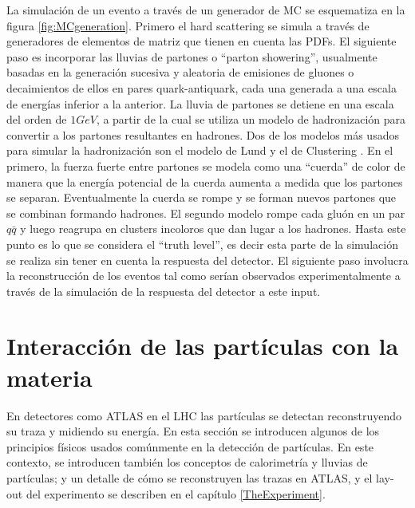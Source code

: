 La simulación de un evento a través de un generador de MC se esquematiza en la figura \ref{fig:MCgeneration}. Primero el hard scattering se simula a través de generadores de elementos de matriz que tienen en cuenta las PDFs. El siguiente paso es incorporar las lluvias de partones o ``parton showering'', usualmente basadas en la generación sucesiva y aleatoria de emisiones de gluones o decaimientos de ellos en pares quark-antiquark, cada una generada a una escala de energías inferior a la anterior. La lluvia de partones se detiene en una escala del orden de $1 GeV$, a partir de la cual se utiliza un modelo de hadronización para convertir a los partones resultantes en hadrones. Dos de los modelos más usados para simular la hadronización son el modelo de Lund \cite{Lund} y el de Clustering \cite{Cluster} . En el primero, la fuerza fuerte entre partones se modela como una ``cuerda''  de color de manera que la energía potencial de la cuerda aumenta a medida que los partones se separan. Eventualmente la cuerda se rompe y se forman nuevos partones que se combinan formando hadrones. El segundo modelo rompe cada gluón en un par $q\bar{q}$ y luego reagrupa en clusters incoloros que dan lugar a los hadrones. Hasta este punto es lo que se considera el ``truth level'', es decir esta parte de la simulación se realiza sin tener en cuenta la respuesta del detector\cite{ParticleDataGroup}. El siguiente paso involucra la reconstrucción de los eventos tal como serían observados experimentalmente a través de la simulación de la respuesta del detector a este input. 


\section{Interacción de las partículas con la materia}

En detectores como ATLAS en el LHC las partículas se detectan reconstruyendo su traza y midiendo su energía. En esta sección se introducen algunos de los principios físicos usados comúnmente en la detección de partículas. En este contexto, se introducen también los conceptos de calorimetría y lluvias de partículas; y un detalle de cómo se reconstruyen las trazas en ATLAS, y el lay-out del experimento se describen en el capítulo \ref{TheExperiment}.\\


